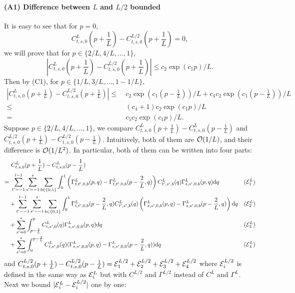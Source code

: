 \documentclass{article}
\theoremstyle{plain}
\theoremstyle{definition}
\begin{document}
\paragraph{(A1) Difference between $L$ and $L/2$ bounded} It is easy to see that for $p=0$, \[C^L_{t,s,0}(p+\frac1L) - C^{L/2}_{t,s,0}(p+\frac1L)=0,\]
we will prove that for $p\in \{2/L, 4/L, \ldots, 1\}$, 
\[|C^L_{t,s,0}(p+\frac1L) - C^{L/2}_{t,s,0}(p+\frac1L)|\leq c_2\exp(c_1p)/L.\]
Then by (C1), for $p\in \{1/L, 3/L, \ldots, 1-1/L\}$,
\begin{align*}
|C^L_{t,s,0}(p+\frac1L) - C^{L/2}_{t,s,0}(p+\frac1L)|\leq &~c_2\exp(c_1(p-\frac1L))/L+c_4c_2\exp(c_1(p-\frac1L))/L\\
\leq &~(c_4+1)c_2\exp(c_1p)/L \\
=&~ c_5c_2\exp(c_1p)/L.
\end{align*}
Suppose $p\in \{2/L, 4/L, \ldots, 1\}$,
we compare $C^L_{t,s,0}(p+\frac1L) - C^L_{t,s,0}(p-\frac1L)$ and $C^{L/2}_{t,s,0}(p+\frac1L) - C^{L/2}_{t,s,0}(p-\frac1L)$. Intuitively, both of them are $\mathcal{O}(1/L)$, and their difference is $\mathcal{O}(1/L^2)$.
In particular, both of them can be written into four parts:
\begin{align*}
    &~C^L_{t,s,0}(p+\frac1L) - C^L_{t,s,0}(p-\frac1L) \\
    =&~\sum_{t'=-1}^{t-1}\sum_{s'=-1}^s \sum_{b\in \{0, 1\}} \int_0^1 \left(\Gamma^L_{t,t',0,b}(p,q) - \Gamma^L_{t,t',0,b}(p-\frac2L,q)\right) C^L_{t',s',b}(q)\Gamma^L_{s,s',0,b}(p,q) \mathrm{d} q & (\mathcal{E}_1^L) \\
    & + \sum_{t'=-1}^{t-1}\sum_{s'=-1}^s \sum_{b\in \{0, 1\}} \int_0^1 \Gamma^L_{t,t',0,b}(p-\frac2L,q) C^L_{t',s',b}(q)\left(\Gamma^L_{s,s',0,b}(p,q) -\Gamma^L_{s,s',0,b}(p-\frac2L,q)\right) \mathrm{d} q & (\mathcal{E}_2^L) \\
    & + \sum_{s'=0}^s \int_{p-\frac2L}^p C^L_{t,s',0}(q) \Gamma_{s,s',0,0}^L(p,q)\mathrm{d} q & (\mathcal{E}_3^L)\\
    & + \sum_{s'=0}^s \int_0^{p-\frac2L} C^L_{t,s',0}(q) (\Gamma_{s,s',0,0}^L(p,q)-\Gamma_{s,s',0,0}^L(p-\frac2L,q))\mathrm{d} q & (\mathcal{E}_4^L)
\end{align*}
and $C^{L/2}_{t,s,0}(p+\frac1L) - C^{L/2}_{t,s,0}(p-\frac1L) = \mathcal{E}_1^{L/2} + \mathcal{E}_2^{L/2}+\mathcal{E}_3^{L/2}+\mathcal{E}_4^{L/2}$ where 
$\mathcal{E}_i^{L/2}$ is defined in the same way as $\mathcal{E}_i^L$ but with $C^{L/2}$ and $\Gamma^{L/2}$ instead of $C^L$ and $\Gamma^L$. Next we bound $|\mathcal{E}_i^L-\mathcal{E}_i^{L/2}|$ one by one:
\end{document}
